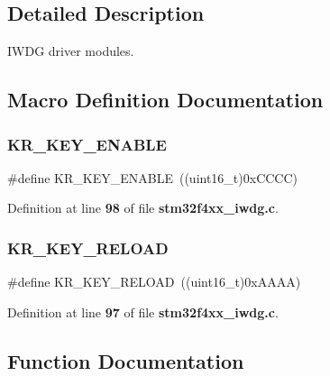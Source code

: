 \subsection{Detailed Description}
I\+W\+DG driver modules. 



\subsection{Macro Definition Documentation}
\mbox{\label{group__IWDG_gaeaa0dd2da3f9d0cce0d708cfff1df545}} 
\subsubsection{K\+R\+\_\+\+K\+E\+Y\+\_\+\+E\+N\+A\+B\+LE}
{\footnotesize\ttfamily \#define K\+R\+\_\+\+K\+E\+Y\+\_\+\+E\+N\+A\+B\+LE~((uint16\+\_\+t)0x\+C\+C\+C\+C)}



Definition at line \textbf{ 98} of file \textbf{ stm32f4xx\+\_\+iwdg.\+c}.

\mbox{\label{group__IWDG_ga830a9a1bad16c7043c86545f4c159a50}} 
\subsubsection{K\+R\+\_\+\+K\+E\+Y\+\_\+\+R\+E\+L\+O\+AD}
{\footnotesize\ttfamily \#define K\+R\+\_\+\+K\+E\+Y\+\_\+\+R\+E\+L\+O\+AD~((uint16\+\_\+t)0x\+A\+A\+A\+A)}



Definition at line \textbf{ 97} of file \textbf{ stm32f4xx\+\_\+iwdg.\+c}.



\subsection{Function Documentation}
\mbox{\label{group__IWDG_ga479b2921c86f8c67b819f5c4bea6bdb6}} 
